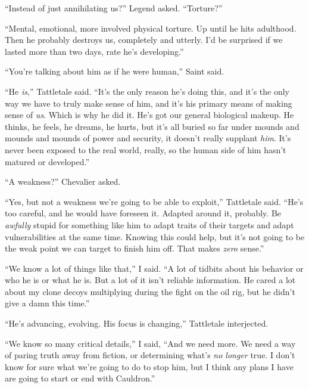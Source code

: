 ``Instead of just annihilating us?'' Legend asked.  ``Torture?''



``Mental, emotional, more involved physical torture.  Up until he hits adulthood.  Then he probably destroys us, completely and utterly.  I'd be surprised if we lasted more than two days, rate he's developing.''



``You're talking about him as if he were human,'' Saint said.



``He \emph{is},'' Tattletale said.  ``It's the only reason he's doing this, and it's the only way we have to truly make sense of him, and it's his primary means of making sense of \emph{us}.  Which is why he did it.  He's got our general biological makeup.  He thinks, he feels, he dreams, he hurts, but it's all buried so far under mounds and mounds and mounds of power and security, it doesn't really supplant \emph{him}.  It's never been exposed to the real world, really, so the human side of him hasn't matured or developed.''



``A weakness?''  Chevalier asked.



``Yes, but not a weakness we're going to be able to exploit,'' Tattletale said.  ``He's too careful, and he would have foreseen it.  Adapted around it, probably.  Be \emph{awfully} stupid for something like him to adapt traits of their targets and adapt vulnerabilities at the same time.  Knowing this could help, but it's not going to be the weak point we can target to finish him off.  That makes \emph{zero} sense.''



``We know a lot of things like that,'' I said.  ``A lot of tidbits about his behavior or who he is or what he is.  But a lot of it isn't reliable information.  He cared a lot about my clone decoys multiplying during the fight on the oil rig, but he didn't give a damn this time.''



``He's advancing, evolving.  His focus is changing,'' Tattletale interjected.



``We know so many critical details,'' I said, ``And we need more.  We need a way of paring truth away from fiction, or determining what's \emph{no longer} true.  I don't know for sure what we're going to do to stop him, but I think any plans I have are going to start or end with Cauldron.''



